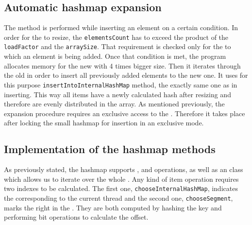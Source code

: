     \subsection{Automatic hashmap expansion}
        The \expandMethod method is performed while inserting an element on a certain condition.
        In order for the \internalHashMap to resize, the \texttt{elementsCount} has to exceed the product of the \texttt{loadFactor} and the \texttt{arraySize}.
        That requirement is checked only for the \internalHashMap to which an element is being added. 
        Once that condition is met, the program allocates memory for the new \internalHashMap with 4 times bigger size. 
        Then it iterates through the old \internalHashMap in order to insert all previously added elements to the new one. 
        It uses for this purpose \texttt{insertIntoInternalHashMap} method, the exactly same one as in inserting.
        This way all items have a newly calculated hash after resizing and therefore are evenly distributed in the array. 
        As mentioned previously, the expansion procedure requires an exclusive access to the \internalHashMap. 
        Therefore it takes place after locking the small hashmap for insertion in an exclusive mode.

    \subsection{Implementation of the hashmap methods}
        As previously stated, the hashmap supports \insertMethod, \getMethod and \removeMethod operations, as well as an \Iterator class which allows us to iterate over the whole \NvmHashMap.
        Any kind of item operation requires two indexes to be calculated. 
        The first one, \texttt{chooseInternalHashMap}, indicates the \internalHashMap corresponding to the current thread and the second one, \texttt{chooseSegment}, marks the right \Segment in the \internalHashMap. 
        They are both computed by hashing the key and performing bit operations to calculate the offset.
    
